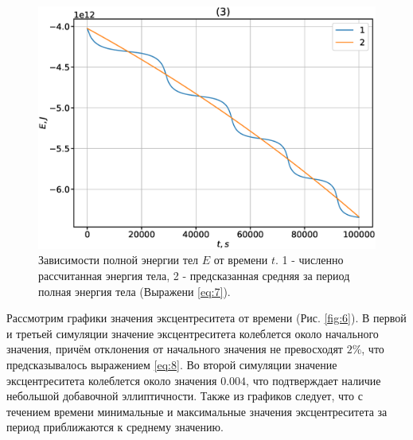 \documentclass[12pt]{article}
\begin{document}
\begin{figure}[H]
      \includegraphics[width=1.0\linewidth]{En_t_3.eps}
    \endminipage
    \caption{Зависимости полной энергии тел $E$ от времени $t$. 1 - численно рассчитанная энергия тела, 
    2 - предсказанная средняя за период полная энергия тела (Выражени \ref{eq:7}).}
    \label{fig:5}
    \end{figure}
Рассмотрим графики значения эксцентреситета от времени (Рис. \ref{fig:6}). В первой и третьей симуляции значение эксцентреситета колеблется 
около начального значения, причём отклонения от начального значения не превосходят $2\%$, что предсказывалось выражением \ref{eq:8}. 
Во второй симуляции значение эксцентреситета колеблется около значения $0.004$, что подтверждает наличие небольшой добавочной эллиптичности.
Также из графиков следует, что с течением времени минимальные и максимальные значения эксцентреситета за период приближаются к среднему значению. 
\end{document}
